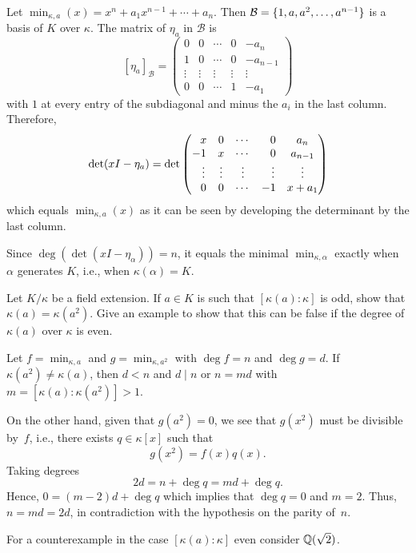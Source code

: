 \begin{solution}
    Let $\min_{\kappa,a}(x)=x^n+a_1x^{n-1}+\cdots+a_n$. Then $\mathcal B=\{1,a,a^2,\dots,a^{n-1}\}$ is a basis of $K$ over $\kappa$. The matrix of $\eta_a$ in $\mathcal B$ is
    $$
        [\eta_a]_{\mathcal B}=\begin{pmatrix}
            0   &0  &\cdots &0 &-a_n\\
            1   &0  &\cdots &0 &-a_{n-1}\\
            \vdots&\vdots&\vdots&\vdots&\vdots\\
            0   &0  &\cdots &1 &-a_1
        \end{pmatrix}
    $$
    with $1$ at every entry of the subdiagonal and minus the $a_i$ in the last column. Therefore,
    $$
        \det(xI-\eta_a) = \det
        \begin{pmatrix}
            \hphantom-x   &0  &\cdots &\hphantom-0 &a_n\\
            -1   &x  &\cdots &\hphantom-0 &a_{n-1}\\
            \hphantom-\vdots&\vdots&\vdots&\hphantom-\vdots&\vdots\\
            \hphantom-0   &0  &\cdots &-1 &x+a_1
        \end{pmatrix}
    $$
    which equals $\min_{\kappa,a}(x)$ as it can be seen by developing the determinant by the last column.

    Since $\deg(\det(xI-\eta_\alpha))=n$, it equals the minimal $\min_{\kappa,\alpha}$ exactly when $\alpha$ generates $K$, i.e., when $\kappa(\alpha)=K$.
\end{solution}

\begin{probl}
    Let\/ $K/\kappa$ be a field extension. If\/ $a \in K$ is such that\/ $[\kappa(a):\kappa]$ is odd, show that\/ $\kappa(a) = \kappa(a^2)$. Give an example to show that this can be false if the degree of\/ $\kappa(a)$ over\/ $\kappa$ is even.
\end{probl}

\begin{solution}
    Let $f=\min_{\kappa,a}$ and $g=\min_{\kappa,a^2}$ with $\deg f=n$ and $\deg g=d$. If $\kappa(a^2)\ne\kappa(a)$, then $d<n$ and $d\mid n$ or $n=md$ with $m=[\kappa(a):\kappa(a^2)]>1$.
    
    On the other hand, given that $g(a^2)=0$, we see that $g(x^2)$ must be divisible by~$f$, i.e., there exists $q\in\kappa[x]$ such that
    $$
        g(x^2) = f(x)q(x).
    $$
    Taking degrees
    $$
        2d = n + \deg q = md + \deg q.
    $$
    Hence, $0=(m-2)d+\deg q$ which implies that $\deg q=0$ and $m=2$. Thus, $n=md=2d$, in contradiction with the hypothesis on the parity of~$n$.

    For a counterexample in the case $[\kappa(a):\kappa]$ even consider $\mathbb{Q}(\sqrt2)$.
\end{solution}


